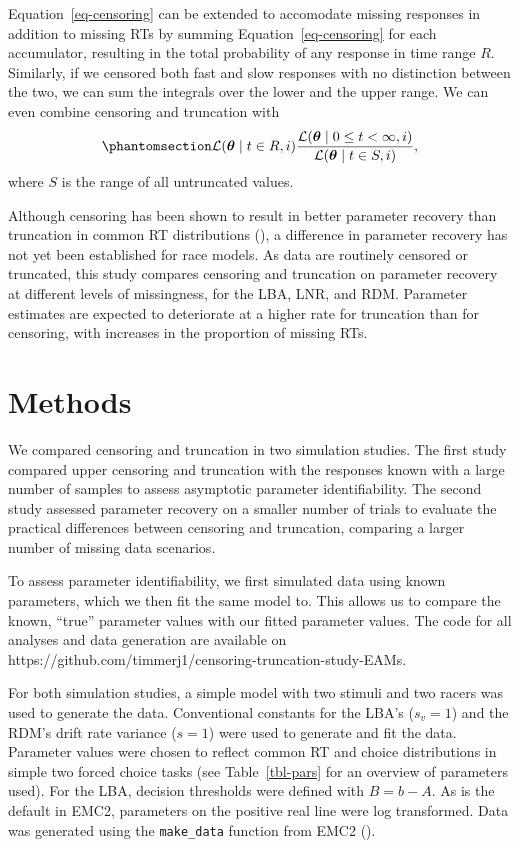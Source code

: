 \documentclass[
  stu,
  longtable,
  nolmodern,
  notxfonts,
  notimes,
  draftfirst,
  colorlinks=true,linkcolor=blue,citecolor=blue,urlcolor=blue]{apa7}
\begin{document}
Equation~\ref{eq-censoring} can be extended to accomodate missing
responses in addition to missing RTs by summing
Equation~\ref{eq-censoring} for each accumulator, resulting in the total
probability of any response in time range \(R\). Similarly, if we
censored both fast and slow responses with no distinction between the
two, we can sum the integrals over the lower and the upper range. We can
even combine censoring and truncation with
\begin{equation}\phantomsection\label{eq-censoringandtruncation}{
\mathcal{L}(\boldsymbol{\theta} \mid t \in R, i) \frac{\mathcal{L}(\boldsymbol{\theta} \mid 0 \leq t < \infty, i)}{\mathcal{L}(\boldsymbol{\theta} \mid t \in S, i)},
}\end{equation} where \(S\) is the range of all untruncated values.

Although censoring has been shown to result in better parameter recovery
than truncation in common RT distributions
(), a difference in
parameter recovery has not yet been established for race models. As data
are routinely censored or truncated, this study compares censoring and
truncation on parameter recovery at different levels of missingness, for
the LBA, LNR, and RDM. Parameter estimates are expected to deteriorate
at a higher rate for truncation than for censoring, with increases in
the proportion of missing RTs.

\section{Methods}\label{methods}

We compared censoring and truncation in two simulation studies. The
first study compared upper censoring and truncation with the responses
known with a large number of samples to assess asymptotic parameter
identifiability. The second study assessed parameter recovery on a
smaller number of trials to evaluate the practical differences between
censoring and truncation, comparing a larger number of missing data
scenarios.

To assess parameter identifiability, we first simulated data using known
parameters, which we then fit the same model to. This allows us to
compare the known, ``true'' parameter values with our fitted parameter
values. The code for all analyses and data generation are available on
https://github.com/timmerj1/censoring-truncation-study-EAMs.

For both simulation studies, a simple model with two stimuli and two
racers was used to generate the data. Conventional constants for the
LBA's (\(s_v = 1\)) and the RDM's drift rate variance (\(s = 1\)) were
used to generate and fit the data. Parameter values were chosen to
reflect common RT and choice distributions in simple two forced choice
tasks (see Table~\ref{tbl-pars} for an overview of parameters used). For
the LBA, decision thresholds were defined with \(B = b - A\). As is the
default in EMC2, parameters on the positive real line were log
transformed. Data was generated using the \texttt{make\_data} function
from EMC2 ().
\end{document}
